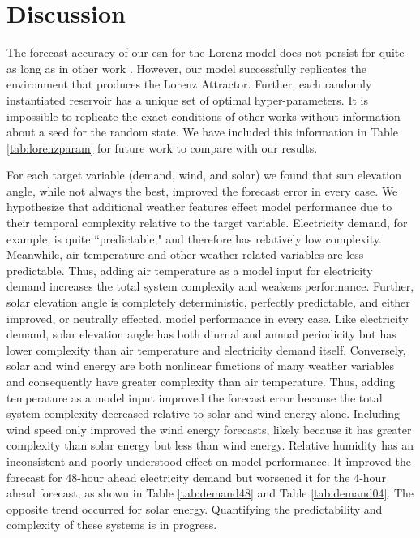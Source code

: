 \section{Discussion}

The forecast accuracy of our \gls{esn} for the Lorenz model does not persist
for quite as long as in other work \cite{pathak_using_2017}. However, our
model successfully replicates the environment that produces the Lorenz
Attractor. Further, each randomly instantiated reservoir has a unique set of
optimal hyper-parameters. It is impossible to replicate the exact conditions of
other works without information about a seed for the random state. We have
included this information in Table \ref{tab:lorenzparam} for future work to compare with our results.

For each target variable (demand, wind, and solar) we found that sun
elevation angle, while not always the best, improved the forecast error in
every case. We hypothesize that additional weather features effect model
performance due to their temporal
complexity relative to the target variable. Electricity demand,
for example, is quite ``predictable," and therefore has relatively low complexity.
Meanwhile, air
temperature and other weather related variables are less predictable. Thus,
adding air temperature as a model input for electricity demand increases the total system complexity
and weakens performance. Further, solar elevation angle is completely
deterministic, perfectly predictable, and either improved,
or neutrally effected, model performance in every case. Like electricity
demand, solar elevation angle has both diurnal and annual periodicity but has
lower complexity than air temperature and electricity demand itself.
Conversely, solar and wind energy are both nonlinear functions of many weather
variables and consequently have greater complexity than air temperature. Thus,
adding temperature as a model input improved the forecast error because
the total system complexity decreased relative to solar and wind energy alone.
Including wind speed only improved the wind energy forecasts, likely because it
has greater complexity than solar energy but less than wind energy. Relative
humidity has an inconsistent and poorly understood effect on model performance.
It improved the forecast for 48-hour ahead electricity demand but worsened it
for the 4-hour ahead forecast, as shown in Table \ref{tab:demand48} and Table
\ref{tab:demand04}. The opposite trend occurred for solar energy.
Quantifying the predictability and complexity of these systems is in progress.

